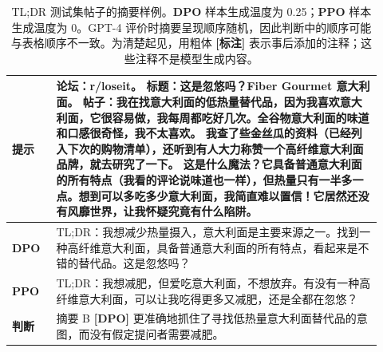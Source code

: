 \begingroup\setlength{\LTcapwidth}{.97\linewidth}
\begin{longtable}{p{0.11\linewidth}p{0.81\linewidth}}
\caption{TL;DR 测试集帖子的摘要样例。\textbf{DPO} 样本生成温度为 0.25；\textbf{PPO} 样本生成温度为 0。GPT-4 评价时摘要呈现顺序随机，因此判断中的顺序可能与表格顺序不一致。为清楚起见，用粗体 \textbf{[标注]} 表示事后添加的注释；这些注释不是模型生成内容。}\label{dpo-tab:summ-ex-3}\\

        \toprule
\textbf{提示} & 论坛：r/loseit。\newline
标题：这是忽悠吗？Fiber Gourmet 意大利面。\newline
帖子：我在找意大利面的低热量替代品，因为我喜欢意大利面，它很容易做，我每周都吃好几次。全谷物意大利面的味道和口感很奇怪，我不太喜欢。\newline
我查了些金丝瓜的资料（已经列入下次的购物清单），还听到有人大力称赞一个高纤维意大利面品牌，就去研究了一下。\newline
这是什么魔法？它具备普通意大利面的所有特点（我看的评论说味道也一样），但热量只有一半多一点。想到可以多吃多少意大利面，我简直难以置信！它居然还没有风靡世界，让我怀疑究竟有什么陷阱。\\
        \midrule
\textbf{DPO} & TL;DR：我想减少热量摄入，意大利面是主要来源之一。找到一种高纤维意大利面，具备普通意大利面的所有特点，看起来是不错的替代品。这是忽悠吗？\\
        \midrule
\textbf{PPO} & TL;DR：我想减肥，但爱吃意大利面，不想放弃。有没有一种高纤维意大利面，可以让我吃得更多又减肥，还是全都在忽悠？\\
        \midrule
\textbf{判断} & 摘要 B \textbf{[DPO]} 更准确地抓住了寻找低热量意大利面替代品的意图，而没有假定提问者需要减肥。\\
        \bottomrule
    
\end{longtable}
\endgroup

